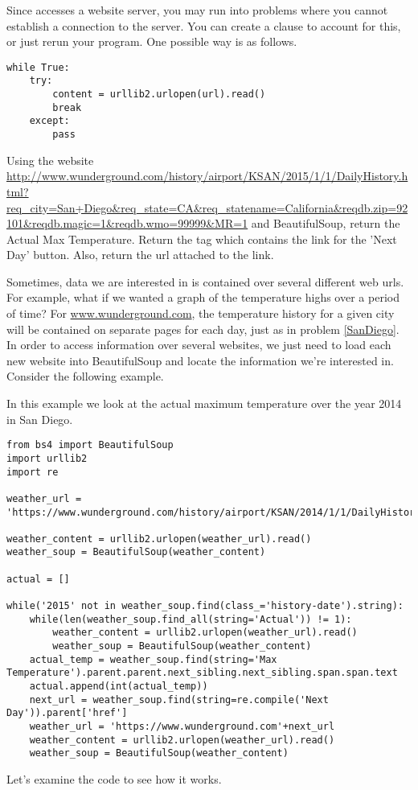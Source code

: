 \begin{warn}
Since  accesses a website server, you may run into problems where you cannot establish a connection to the server.
You can create a  clause to account for this, or just rerun your program.
One possible way is as follows.
\begin{lstlisting}
while True:
    try:
        content = urllib2.urlopen(url).read()
        break
    except:
        pass
\end{lstlisting}
\end{warn}

\begin{problem}\label{SanDiego}

Using the website \url{http://www.wunderground.com/history/airport/KSAN/2015/1/1/DailyHistory.html?req_city=San+Diego&req_state=CA&req_statename=California&reqdb.zip=92101&reqdb.magic=1&reqdb.wmo=99999&MR=1} 
and BeautifulSoup, return the Actual Max Temperature.
Return the tag which contains the link for the 'Next Day' button.
Also, return the url attached to the link.

\end{problem}

Sometimes, data we are interested in is contained over several different web urls.
For example, what if we wanted a graph of the temperature highs over a period of time?
For \url{www.wunderground.com}, the temperature history for a given city will be contained on separate pages for each day, just as in problem \ref{SanDiego}. In order to access information over several websites, we just need to load each new website into BeautifulSoup and locate the information we're interested in. Consider the following example.

In this example we look at the actual maximum temperature over the year 2014 in San Diego.
\begin{lstlisting}
from bs4 import BeautifulSoup
import urllib2
import re

weather_url = 'https://www.wunderground.com/history/airport/KSAN/2014/1/1/DailyHistory.html'

weather_content = urllib2.urlopen(weather_url).read()
weather_soup = BeautifulSoup(weather_content)

actual = []

while('2015' not in weather_soup.find(class_='history-date').string):
    while(len(weather_soup.find_all(string='Actual')) != 1):
        weather_content = urllib2.urlopen(weather_url).read()
        weather_soup = BeautifulSoup(weather_content)
    actual_temp = weather_soup.find(string='Max Temperature').parent.parent.next_sibling.next_sibling.span.span.text
    actual.append(int(actual_temp))
    next_url = weather_soup.find(string=re.compile('Next Day')).parent['href']
    weather_url = 'https://www.wunderground.com'+next_url
    weather_content = urllib2.urlopen(weather_url).read()
    weather_soup = BeautifulSoup(weather_content)

\end{lstlisting}
Let's examine the code to see how it works.

